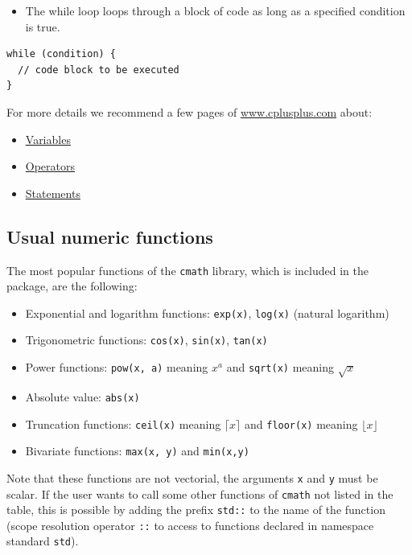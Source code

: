 \begin{itemize}
\tightlist
\item
  The while loop loops through a block of code as long as a specified condition is true.
\end{itemize}

\begin{verbatim}
while (condition) {
  // code block to be executed
}
\end{verbatim}

For more details we recommend a few pages of \href{https://www.cplusplus.com/}{www.cplusplus.com} about:

\begin{itemize}
\tightlist
\item
  \href{https://www.cplusplus.com/doc/tutorial/variables/}{Variables}
\item
  \href{https://www.cplusplus.com/doc/tutorial/operators/}{Operators}
\item
  \href{https://www.cplusplus.com/doc/tutorial/control/}{Statements}
\end{itemize}

\hypertarget{usual-numeric-functions}{%
\subsection{Usual numeric functions}\label{usual-numeric-functions}}

The most popular functions of the \texttt{cmath} library, which is included in the package, are the following:

\begin{itemize}
\tightlist
\item
  Exponential and logarithm functions: \texttt{exp(x)}, \texttt{log(x)} (natural logarithm)
\item
  Trigonometric functions: \texttt{cos(x)}, \texttt{sin(x)}, \texttt{tan(x)}
\item
  Power functions: \texttt{pow(x,\ a)} meaning \(x^a\) and \texttt{sqrt(x)} meaning \(\sqrt{x}\)
\item
  Absolute value: \texttt{abs(x)}
\item
  Truncation functions: \texttt{ceil(x)} meaning \(\lceil x \rceil\) and \texttt{floor(x)} meaning \(\lfloor x \rfloor\)
\item
  Bivariate functions: \texttt{max(x,\ y)} and \texttt{min(x,y)}
\end{itemize}

Note that these functions are not vectorial, the arguments \texttt{x} and \texttt{y} must be scalar. If the user wants to call some other functions of \texttt{cmath} not listed in the table, this is possible by adding the prefix \texttt{std::} to the name of the function (scope resolution operator \texttt{::} to access to functions declared in namespace standard \texttt{std}).

